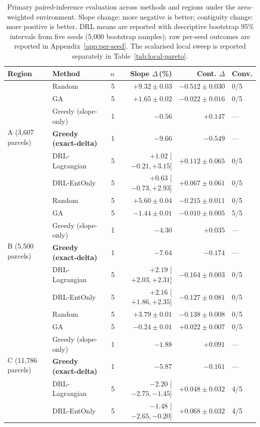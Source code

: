 \documentclass[]{interact}
\theoremstyle{plain}
\begin{document}
\begin{table}[htbp]
\centering
\caption{Primary paired-inference evaluation across methods and regions under the area-weighted environment. Slope change: more negative is better; contiguity change: more positive is better. DRL means are reported with descriptive bootstrap 95\% intervals from five seeds (5{,}000 bootstrap samples); raw per-seed outcomes are reported in Appendix~\ref{app:per-seed}. The scalarised local sweep is reported separately in Table~\ref{tab:local-pareto}.}
\label{tab:main}
\small
\begin{tabular}{llrrrl}
\toprule
Region & Method & $n$ & Slope $\Delta$\,(\%) & Cont. $\Delta$ & Conv.\\
\midrule
\multirow{6}{*}{A (3{,}607 parcels)}
& Random                   & 5 & $+9.32 \pm 0.03$ & $-0.512 \pm 0.030$ & 0/5 \\
& GA                       & 5 & $+1.65 \pm 0.02$ & $-0.022 \pm 0.016$ & 0/5 \\
& Greedy (slope-only)      & 1 & $-0.56$ & $+0.147$ & --- \\
& \textbf{Greedy (exact-delta)} & 1 & $\mathbf{-9.66}$ & $-0.549$ & --- \\
& DRL-Lagrangian           & 5 & $+1.02$ \tiny{[$-0.21, +3.15$]} & $+0.112 \pm 0.065$ & 0/5 \\
& DRL-EntOnly              & 5 & $+0.63$ \tiny{[$-0.73, +2.93$]} & $+0.067 \pm 0.061$ & 0/5 \\
\midrule
\multirow{6}{*}{B (5{,}500 parcels)}
& Random                   & 5 & $+5.60 \pm 0.04$ & $-0.215 \pm 0.011$ & 0/5 \\
& GA                       & 5 & $-1.44 \pm 0.01$ & $-0.010 \pm 0.005$ & 5/5 \\
& Greedy (slope-only)      & 1 & $-4.30$ & $+0.035$ & --- \\
& \textbf{Greedy (exact-delta)} & 1 & $\mathbf{-7.64}$ & $-0.174$ & --- \\
& DRL-Lagrangian           & 5 & $+2.19$ \tiny{[$+2.03, +2.31$]} & $-0.164 \pm 0.003$ & 0/5 \\
& DRL-EntOnly              & 5 & $+2.16$ \tiny{[$+1.86, +2.35$]} & $-0.127 \pm 0.081$ & 0/5 \\
\midrule
\multirow{6}{*}{C (11{,}786 parcels)}
& Random                   & 5 & $+3.79 \pm 0.01$ & $-0.138 \pm 0.008$ & 0/5 \\
& GA                       & 5 & $-0.24 \pm 0.01$ & $+0.022 \pm 0.007$ & 0/5 \\
& Greedy (slope-only)      & 1 & $-1.88$ & $+0.091$ & --- \\
& \textbf{Greedy (exact-delta)} & 1 & $\mathbf{-5.87}$ & $-0.161$ & --- \\
& DRL-Lagrangian           & 5 & $-2.20$ \tiny{[$-2.75, -1.45$]} & $+0.048 \pm 0.032$ & 4/5 \\
& DRL-EntOnly              & 5 & $-1.48$ \tiny{[$-2.65, -0.20$]} & $+0.068 \pm 0.032$ & 4/5 \\
\bottomrule
\end{tabular}
\end{table}
\end{document}
